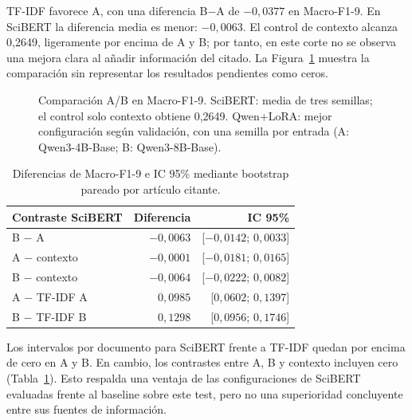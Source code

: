 \documentclass[10pt,a4paper,twocolumn]{article}
\begin{document}
TF-IDF favorece A, con una diferencia B$-$A de $-0{,}0377$ en Macro-F1-9. En SciBERT la diferencia media es menor: $-0{,}0063$. El control de contexto alcanza 0,2649, ligeramente por encima de A y B; por tanto, en este corte no se observa una mejora clara al añadir información del citado. La Figura~\ref{fig:bars} muestra la comparación sin representar los resultados pendientes como ceros.

\begin{figure}[t]
\centering
{}
\caption{Comparación A/B en Macro-F1-9. SciBERT: media de tres semillas; el control solo contexto obtiene 0,2649. Qwen+LoRA: mejor configuración según validación, con una semilla por entrada (A: Qwen3-4B-Base; B: Qwen3-8B-Base).}\label{fig:bars}
\end{figure}

\begin{table}[t]
\centering\small
\caption{Diferencias de Macro-F1-9 e IC 95\% mediante bootstrap pareado por artículo citante.}\label{tab:ci}
\setlength{\tabcolsep}{3pt}
\begin{tabular}{lrr}\toprule
Contraste SciBERT & Diferencia & IC 95\%\\\midrule
B $-$ A & $-0,0063$ & [$-0,0142$; $0,0033$]\\
A $-$ contexto & $-0,0001$ & [$-0,0181$; $0,0165$]\\
B $-$ contexto & $-0,0064$ & [$-0,0222$; $0,0082$]\\
A $-$ TF-IDF A & $0,0985$ & [$0,0602$; $0,1397$]\\
B $-$ TF-IDF B & $0,1298$ & [$0,0956$; $0,1746$]\\\bottomrule
\end{tabular}
\end{table}

Los intervalos por documento para SciBERT frente a TF-IDF quedan por encima de cero en A y B. En cambio, los contrastes entre A, B y contexto incluyen cero (Tabla~\ref{tab:ci}). Esto respalda una ventaja de las configuraciones de SciBERT evaluadas frente al baseline sobre este test, pero no una superioridad concluyente entre sus fuentes de información.
\end{document}
